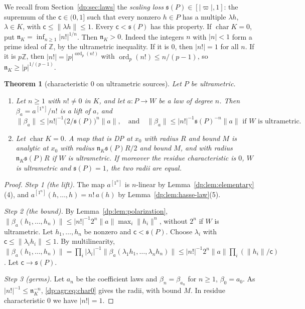 \documentclass[11pt]{amsart}
\newtheorem{theorem}{Theorem}[section]
\theoremstyle{definition}
\theoremstyle{remark}
\numberwithin{equation}{section}
\newcommand{\Z}{\mathbb Z}
\newcommand{\abs}[1]{\lvert #1\rvert}
\newcommand{\norm}[1]{\lVert #1\rVert}
\newcommand{\ord}{\operatorname{ord}}
\theoremstyle{plain}
\theoremstyle{definition}
\theoremstyle{plain}
\begin{document}
We recall from Section~\ref{dp:sec:laws} the \emph{scaling loss} $\mathfrak s(P)\in[\abs\varpi,1]$: the supremum of the $\mathsf c\in(0,1]$ such that every nonzero $h\in P$ has a multiple $\lambda h$, $\lambda\in K$, with $\mathsf c\le\norm{\lambda h}\le1$. Every $\mathsf c<\mathfrak s(P)$ has this property. If $\operatorname{char}K=0$, put $\mathfrak n_K=\inf_{n\ge1}\abs{n!}^{1/n}$. Then $\mathfrak n_K>0$. Indeed the integers $n$ with $\abs n<1$ form a prime ideal of $\Z$, by the ultrametric inequality. If it is $0$, then $\abs{n!}=1$ for all $n$. If it is $p\Z$, then $\abs{n!}=\abs p^{\ord_p(n!)}$ with $\ord_p(n!)\le n/(p-1)$, so $\mathfrak n_K\ge\abs p^{1/(p-1)}$.

\begin{theorem}[characteristic $0$ on ultrametric sources]\label{dp:thm:agreement-char0}
Let $P$ be ultrametric.
\begin{enumerate}
\item Let $n\ge1$ with $n!\ne0$ in $K$, and let $a\colon P\to W$ be a law of degree $n$. Then $\beta_a=a^{[1^n]}/n!$ is a lift of $a$, and
\begin{equation}\label{dp:agr:eq:char0}
 \norm{\beta_a}\le\abs{n!}^{-1}\bigl(2/\mathfrak s(P)\bigr)^n\norm a,\quad\text{and}\quad\norm{\beta_a}\le\abs{n!}^{-1}\mathfrak s(P)^{-n}\norm a\text{ if $W$ is ultrametric.}
\end{equation}
\item Let $\operatorname{char}K=0$. A map that is DP at $x_0$ with radius $R$ and bound $M$ is analytic at $x_0$ with radius $\mathfrak n_K\mathfrak s(P)R/2$ and bound $M$, and with radius $\mathfrak n_K\mathfrak s(P)R$ if $W$ is ultrametric. If moreover the residue characteristic is $0$, $W$ is ultrametric and $\mathfrak s(P)=1$, the two radii are equal.
\end{enumerate}
\end{theorem}

\begin{proof}
\emph{Step 1 (the lift).} The map $a^{[1^n]}$ is $n$\nobreakdash-linear by Lemma~\ref{dp:lem:elementary}(4), and $a^{[1^n]}(h,\dots,h)=n!\,a(h)$ by Lemma~\ref{dp:lem:hasse-law}(5).

\emph{Step 2 (the bound).} By Lemma~\ref{dp:lem:polarization}, $\norm{\beta_a(h_1,\dots,h_n)}\le\abs{n!}^{-1}2^n\norm a\max_i\norm{h_i}^n$, without $2^n$ if $W$ is ultrametric. Let $h_1,\dots,h_n$ be nonzero and $\mathsf c<\mathfrak s(P)$. Choose $\lambda_i$ with $\mathsf c\le\norm{\lambda_ih_i}\le1$. By multilinearity, $\norm{\beta_a(h_1,\dots,h_n)}=\prod_i\abs{\lambda_i}^{-1}\norm{\beta_a(\lambda_1h_1,\dots,\lambda_nh_n)}\le\abs{n!}^{-1}2^n\norm a\prod_i(\norm{h_i}/\mathsf c)$. Let $\mathsf c\to\mathfrak s(P)$.

\emph{Step 3 (germs).} Let $a_n$ be the coefficient laws and $\beta_n=\beta_{a_n}$ for $n\ge1$, $\beta_0=a_0$. As $\abs{n!}^{-1}\le\mathfrak n_K^{-n}$, \eqref{dp:agr:eq:char0} gives the radii, with bound $M$. In residue characteristic $0$ we have $\abs{n!}=1$.
\end{proof}
\end{document}
